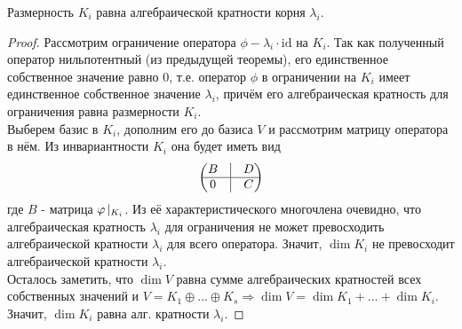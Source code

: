     \begin{theorem}
        Размерность $K_i$ равна алгебраической кратности корня $\lambda_i$.
    \end{theorem}
    \begin{proof}
        Рассмотрим ограничение оператора $\phi - \lambda_i\cdot\text{id}$ на $K_i$. Так как полученный оператор нильпотентный (из предыдущей теоремы), его единственное собственное значение равно $0$, т.е. оператор $\phi$ в ограничении на $K_i$ имеет единственное собственное значение $\lambda_i$, причём его алгебраическая кратность для ограничения равна размерности $K_i$.\\
        Выберем базис в $K_i$, дополним его до базиса $V$ и рассмотрим матрицу оператора в нём. Из инвариантности $K_i$ она будет иметь вид 
        $$\begin{pmatrix}
            B & \vline & D \\ \hline 0 & \vline & C
        \end{pmatrix}$$
        где $B$ - матрица $\phi \hspace{0.05cm} |_{K_i}$. Из её характеристического многочлена очевидно, что алгебраическая кратность $\lambda_i$ для ограничения не может превосходить алгебраической кратности $\lambda_i$ для всего оператора. Значит, $\dim K_i$ не превосходит алгебраической кратности $\lambda_i$.\\
        Осталось заметить, что $\dim V$ равна сумме алгебраических кратностей всех собственных значений и $V = K_1 \oplus ... \oplus K_s \Rightarrow \dim V = \dim K_1 + ... + \dim K_i$. Значит, $\dim K_i$ равна алг. кратности $\lambda_i$.      
    \end{proof}